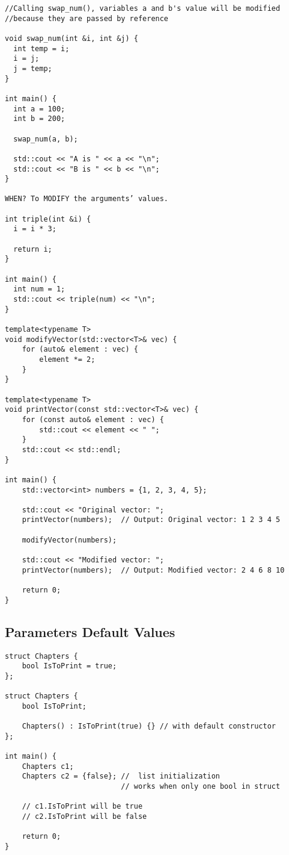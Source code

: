 \begin{verbatim}
//Calling swap_num(), variables a and b's value will be modified
//because they are passed by reference

void swap_num(int &i, int &j) {
  int temp = i;
  i = j;
  j = temp;
}
 
int main() {
  int a = 100;
  int b = 200;
 
  swap_num(a, b);
 
  std::cout << "A is " << a << "\n";
  std::cout << "B is " << b << "\n";
}

WHEN? To MODIFY the arguments’ values.

int triple(int &i) {
  i = i * 3;
  
  return i;
}

int main() {
  int num = 1;
  std::cout << triple(num) << "\n";
}

template<typename T>
void modifyVector(std::vector<T>& vec) {
    for (auto& element : vec) {
        element *= 2;
    }
}

template<typename T>
void printVector(const std::vector<T>& vec) {
    for (const auto& element : vec) {
        std::cout << element << " ";
    }
    std::cout << std::endl;
}

int main() {
    std::vector<int> numbers = {1, 2, 3, 4, 5};

    std::cout << "Original vector: ";
    printVector(numbers);  // Output: Original vector: 1 2 3 4 5

    modifyVector(numbers);

    std::cout << "Modified vector: ";
    printVector(numbers);  // Output: Modified vector: 2 4 6 8 10

    return 0;
}
\end{verbatim}

\subsection{Parameters Default Values}

\begin{verbatim}
struct Chapters {
    bool IsToPrint = true;
};

struct Chapters {
    bool IsToPrint;

    Chapters() : IsToPrint(true) {} // with default constructor
};

int main() {
    Chapters c1;
    Chapters c2 = {false}; //  list initialization
                           // works when only one bool in struct

    // c1.IsToPrint will be true
    // c2.IsToPrint will be false

    return 0;
}
\end{verbatim}

